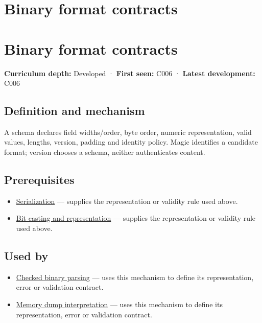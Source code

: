 \hypertarget{appendix-590bbb2424c1}{}
\section*{Binary format contracts}
\section{Binary format contracts}\label{binary-format-contracts}

\textbf{Curriculum depth:} Developed · \textbf{First seen:} C006 · \textbf{Latest development:} C006

\subsection{Definition and mechanism}\label{definition-and-mechanism}

A schema declares field widths/order, byte order, numeric representation, valid values, lengths, version, padding and identity policy. Magic identifies a candidate format; version chooses a schema, neither authenticates content.

\subsection{Prerequisites}\label{prerequisites}

\begin{itemize}
\tightlist
\item
  \hyperref[appendix-91d09ebed979]{Serialization} --- supplies the representation or validity rule used above.
\item
  \hyperref[appendix-34ee45f161c1]{Bit casting and representation} --- supplies the representation or validity rule used above.
\end{itemize}

\subsection{Used by}\label{used-by}

\begin{itemize}
\tightlist
\item
  \hyperref[appendix-652d81568de9]{Checked binary parsing} --- uses this mechanism to define its representation, error or validation contract.
\item
  \hyperref[appendix-230b59c0676b]{Memory dump interpretation} --- uses this mechanism to define its representation, error or validation contract.
\end{itemize}

